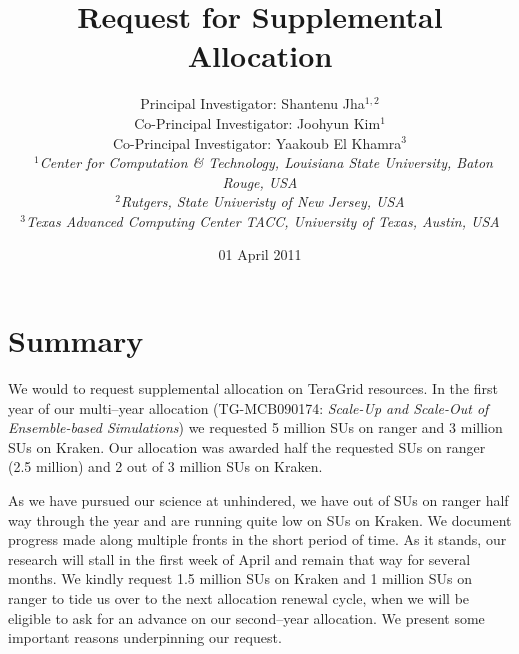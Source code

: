 \documentclass[a4paper,10pt]{article}
\begin{document}
\title{\Large Request for Supplemental Allocation}

\author{Principal Investigator: Shantenu Jha$^{1,2}$ \\ Co-Principal Investigator: Joohyun Kim$^{1}$ \\ Co-Principal Investigator: Yaakoub El Khamra$^{3}$\\\
   \small{\emph{$^{1}$Center for Computation \& Technology, Louisiana State University, Baton Rouge,
USA}}
\\
  \small{\emph{$^{2}$Rutgers, State Univeristy of New Jersey, USA}}
\\
  \small{\emph{$^{3}$Texas Advanced Computing Center TACC, University of Texas, Austin, USA}}}

\newif\ifdraft
\drafttrue
\ifdraft
\newcommand{\amnote}[1]{ {\textcolor{magenta} { ***AM: #1c }}}
\newcommand{\jhanote}[1]{ {\textcolor{red} { ***SJ: #1 }}}
\newcommand{\michaelnote}[1]{ {\textcolor{blue} { ***MM: #1 }}}
\else
\newcommand{\amnote}[1]{}
\newcommand{\jhanote}[1]{}
\newcommand{\michaelnote}[1]{ {\textcolor{blue} { ***MM: #1 }}}
\fi


\date{01 April 2011}

\maketitle

\section{Summary}

We would to request supplemental allocation on TeraGrid resources. In the first year of our multi--year allocation (TG-MCB090174: {\it Scale-Up and Scale-Out of Ensemble-based Simulations}) we requested 5 million SUs on ranger and 3 million SUs on Kraken. Our allocation was awarded half the requested SUs on ranger (2.5 million) and 2 out of 3 million SUs on Kraken.

As we have pursued our science at unhindered, we have out of SUs on ranger half way through the year and are running quite low on SUs on Kraken.  We document progress made along multiple fronts in the short period of time.  As it stands, our research will stall in the first week of April and remain that way for several months.  We kindly request 1.5 million SUs on Kraken and 1 million SUs on ranger to tide us over to the next allocation renewal cycle, when we will be eligible to ask for an advance on our second--year allocation.  We present some important reasons underpinning our request.
\end{document}
